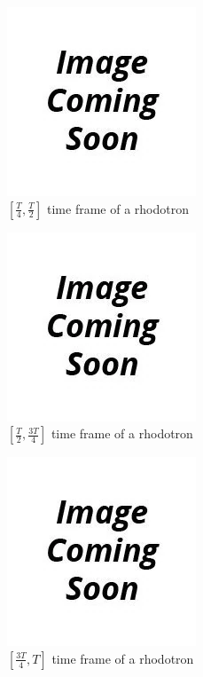 \documentclass[a4paper,oneside,12pt]{report}
\numberwithin{equation}{chapter}
\begin{document}
\begin{figure}[H]
    \centering
    \includegraphics[scale=0.75]{./figures/to_be_added.png}
    \caption{$[\frac{T}{4}, \frac{T}{2}]$ time frame of a rhodotron}
\end{figure}

\begin{figure}[H]
    \centering
    \includegraphics[scale=0.75]{./figures/to_be_added.png}
    \caption{$[\frac{T}{2}, \frac{3T}{4}]$ time frame of a rhodotron}
\end{figure}

\begin{figure}[H]
    \centering
    \includegraphics[scale=0.75]{./figures/to_be_added.png}
    \caption{$[\frac{3T}{4}, T]$ time frame of a rhodotron}
\end{figure}
\end{document}
